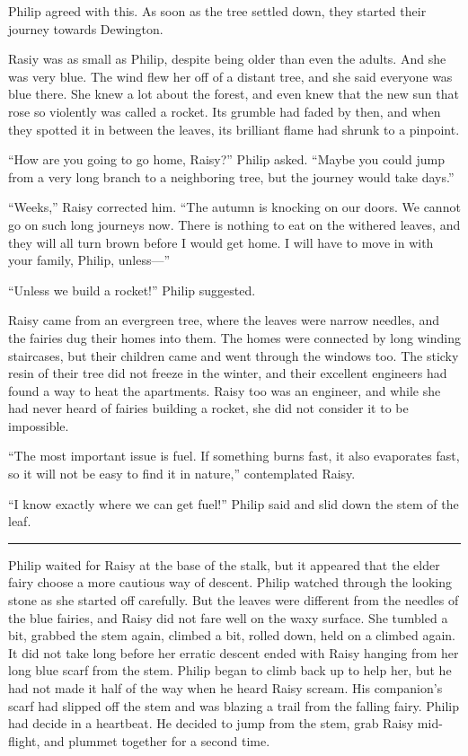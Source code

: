 \documentclass[10pt, draft]{memoir}
\renewcommand{\pfbreakdisplay}{\bigskip \ding{166} \bigskip}
\newcommand{\secbreak}{\fancybreak{\pfbreakdisplay}}
\begin{document}
Philip agreed with this. As soon as the tree settled down, they started their journey towards Dewington.

Rasiy was as small as Philip, despite being older than even the adults. And she was very blue. The wind flew her off of a distant tree, and she said everyone was blue there. She knew a lot about the forest, and even knew that the new sun that rose so violently was called a rocket. Its grumble had faded by then, and when they spotted it in between the leaves, its brilliant flame had shrunk to a pinpoint.

``How are you going to go home, Raisy?'' Philip asked. ``Maybe you could jump from a very long branch to a neighboring tree, but the journey would take days.”

``Weeks,'' Raisy corrected him. ``The autumn is knocking on our doors. We cannot go on such long journeys now. There is nothing to eat on the withered leaves, and they will all turn brown before I would get home. I will have to move in with your family, Philip, unless---''

``Unless we build a rocket!'' Philip suggested.

Raisy came from an evergreen tree, where the leaves were narrow needles, and the fairies dug their homes into them. The homes were connected by long winding staircases, but their children came and went through the windows too. The sticky resin of their tree did not freeze in the winter, and their excellent engineers had found a way to heat the apartments. Raisy too was an engineer, and while she had never heard of fairies building a rocket, she did not consider it to be impossible.

``The most important issue is fuel. If something burns fast, it also evaporates fast, so it will not be easy to find it in nature,'' contemplated Raisy.

``I know exactly where we can get fuel!'' Philip said and slid down the stem of the leaf.

\secbreak

Philip waited for Raisy at the base of the stalk, but it appeared that the elder fairy choose a more cautious way of descent. Philip watched through the looking stone as she started off carefully. But the leaves were different from the needles of the blue fairies, and Raisy did not fare well on the waxy surface. She tumbled a bit, grabbed the stem again, climbed a bit, rolled down, held on a climbed again. It did not take long before her erratic descent ended with Raisy hanging from her long blue scarf from the stem. Philip began to climb back up to help her, but he had not made it half of the way when he heard Raisy scream. His companion's scarf had slipped off the stem and was blazing a trail from the falling fairy. Philip had decide in a heartbeat. He decided to jump from the stem, grab Raisy mid-flight, and plummet together for a second time.
\end{document}
